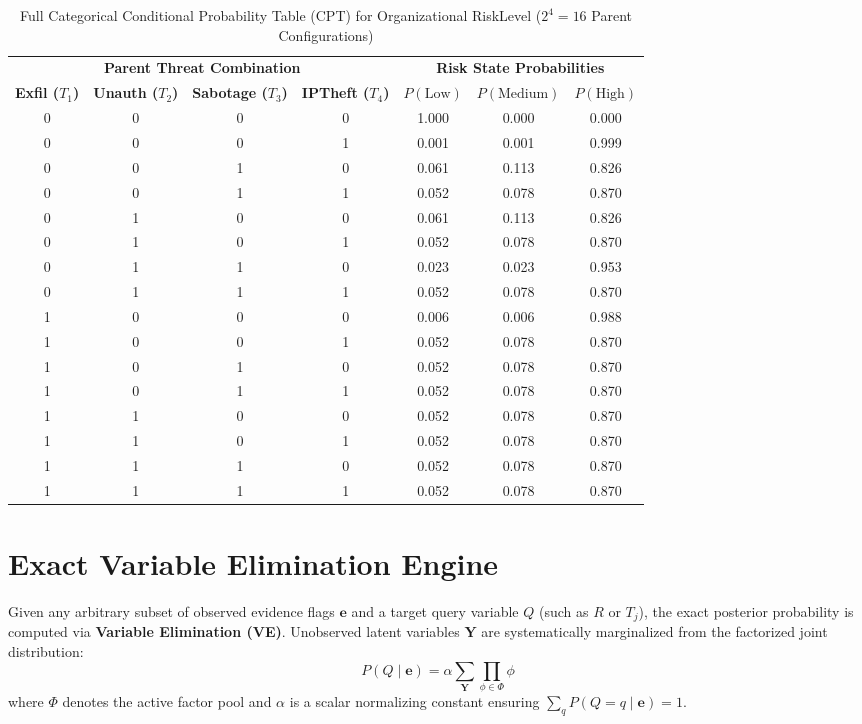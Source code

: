 \documentclass[12pt,a4paper]{report}
\begin{document}
\begin{table}[H]
\centering
\caption{Full Categorical Conditional Probability Table (CPT) for Organizational RiskLevel ($2^4 = 16$ Parent Configurations)}
\label{tab:risklevel_cpt}
\fontsize{9}{11.5}\selectfont
\begin{tabular}{ccccccc}
\toprule
\multicolumn{4}{c}{\textbf{Parent Threat Combination}} & \multicolumn{3}{c}{\textbf{Risk State Probabilities}} \\
\cmidrule(lr){1-4} \cmidrule(lr){5-7}
\textbf{Exfil ($T_1$)} & \textbf{Unauth ($T_2$)} & \textbf{Sabotage ($T_3$)} & \textbf{IPTheft ($T_4$)} & \textbf{$P(\text{Low})$} & \textbf{$P(\text{Medium})$} & \textbf{$P(\text{High})$} \\
\midrule
0 & 0 & 0 & 0 & 1.000 & 0.000 & 0.000 \\
0 & 0 & 0 & 1 & 0.001 & 0.001 & 0.999 \\
0 & 0 & 1 & 0 & 0.061 & 0.113 & 0.826 \\
0 & 0 & 1 & 1 & 0.052 & 0.078 & 0.870 \\
0 & 1 & 0 & 0 & 0.061 & 0.113 & 0.826 \\
0 & 1 & 0 & 1 & 0.052 & 0.078 & 0.870 \\
0 & 1 & 1 & 0 & 0.023 & 0.023 & 0.953 \\
0 & 1 & 1 & 1 & 0.052 & 0.078 & 0.870 \\
1 & 0 & 0 & 0 & 0.006 & 0.006 & 0.988 \\
1 & 0 & 0 & 1 & 0.052 & 0.078 & 0.870 \\
1 & 0 & 1 & 0 & 0.052 & 0.078 & 0.870 \\
1 & 0 & 1 & 1 & 0.052 & 0.078 & 0.870 \\
1 & 1 & 0 & 0 & 0.052 & 0.078 & 0.870 \\
1 & 1 & 0 & 1 & 0.052 & 0.078 & 0.870 \\
1 & 1 & 1 & 0 & 0.052 & 0.078 & 0.870 \\
1 & 1 & 1 & 1 & 0.052 & 0.078 & 0.870 \\
\bottomrule
\end{tabular}
\end{table}

\section{Exact Variable Elimination Engine}
Given any arbitrary subset of observed evidence flags $\mathbf{e}$ and a target query variable $Q$ (such as $R$ or $T_j$), the exact posterior probability is computed via \textbf{Variable Elimination (VE)}. Unobserved latent variables $\mathbf{Y}$ are systematically marginalized from the factorized joint distribution:
\begin{equation}
P(Q \mid \mathbf{e}) = \alpha \sum_{\mathbf{Y}} \prod_{\phi \in \Phi} \phi
\label{eq:var_elim}
\end{equation}
where $\Phi$ denotes the active factor pool and $\alpha$ is a scalar normalizing constant ensuring $\sum_q P(Q = q \mid \mathbf{e}) = 1$.
\end{document}
